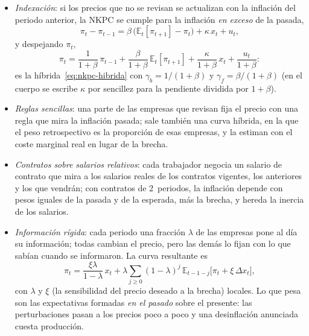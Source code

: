 \documentclass[11pt]{article}
\begin{document}
\begin{itemize}
\item \emph{Indexación}\nocite{ChristianoEichenbaumEvans2005}: si los precios que no se revisan se actualizan con la inflación del periodo anterior, la NKPC se cumple para la inflación \emph{en exceso} de la pasada,
  \begin{equation*}
  \pi_t-\pi_{t-1}=\beta\,\big(\mathbb{E}_t[\pi_{t+1}]-\pi_t\big)+\kappa\,x_t+u_t ,
  \end{equation*}
  y despejando $\pi_t$,
  \begin{equation*}
  \pi_t=\frac{1}{1+\beta}\,\pi_{t-1}+\frac{\beta}{1+\beta}\,\mathbb{E}_t[\pi_{t+1}]+\frac{\kappa}{1+\beta}\,x_t+\frac{u_t}{1+\beta}:
  \end{equation*}
  es la híbrida~\eqref{eq:nkpc-hibrida} con $\gamma_b=1/(1+\beta)$ y $\gamma_f=\beta/(1+\beta)$ (en el cuerpo se escribe $\kappa$ por sencillez para la pendiente dividida por $1+\beta$).\findemo
\item \emph{Reglas sencillas}\nocite{GaliGertler1999Inflation}: una parte de las empresas que revisan fija el precio con una regla que mira la inflación pasada; sale también una curva híbrida, en la que el peso retrospectivo es la proporción de esas empresas, y la estiman con el coste marginal real en lugar de la brecha.
\item \emph{Contratos sobre salarios relativos}\nocite{FuhrerMoore1995Inflation}: cada trabajador negocia un salario de contrato que mira a los salarios reales de los contratos vigentes, los anteriores y los que vendrán; con contratos de 2~periodos, la inflación depende con pesos iguales de la pasada y de la esperada, más la brecha, y hereda la inercia de los salarios.
\item \emph{Información rígida}\nocite{MankiwReis2002Sticky}: cada periodo una fracción $\lambda$ de las empresas pone al día su información; todas cambian el precio, pero las demás lo fijan con lo que sabían cuando se informaron. La curva resultante es
  \begin{equation*}
  \pi_t=\frac{\xi\lambda}{1-\lambda}\,x_t+\lambda\sum_{j\geq0}(1-\lambda)^j\,\mathbb{E}_{t-1-j}\big[\pi_t+\xi\,\Delta x_t\big],
  \end{equation*}
  con $\lambda$ y $\xi$ (la sensibilidad del precio deseado a la brecha) locales. Lo que pesa son las expectativas formadas \emph{en el pasado} sobre el presente: las perturbaciones pasan a los precios poco a poco y una desinflación anunciada cuesta producción.
\end{itemize}
\end{document}
